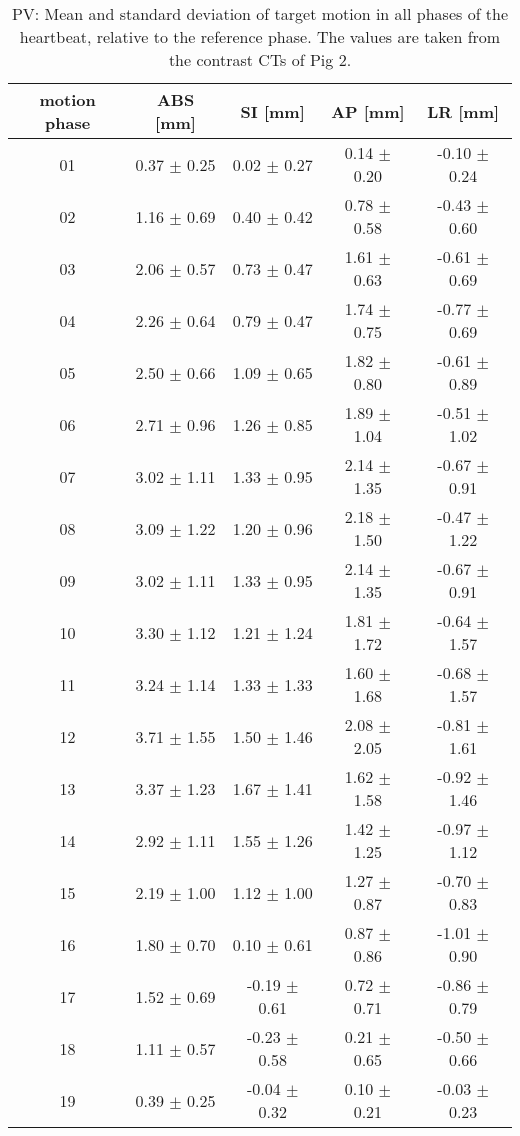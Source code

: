 

\begin{table}[H]
  \centering
  \scriptsize
  \caption{PV: Mean and standard deviation of target motion in all phases of the heartbeat, relative to the reference phase. The values are 
  taken from the contrast CTs of Pig 2.}
  \begin{tabular}{|c|c|c|c|c|}
    \hline\hline
    motion phase\rule{0pt}{2.6ex}\rule[-1.2ex]{0pt}{0pt} & ABS [mm] & SI [mm] & AP [mm] & LR [mm]\\
    \hline
01 &0.37 $\pm$ 0.25 &0.02 $\pm$ 0.27 &0.14 $\pm$ 0.20 &-0.10 $\pm$ 0.24 \\
02 &1.16 $\pm$ 0.69 &0.40 $\pm$ 0.42 &0.78 $\pm$ 0.58 &-0.43 $\pm$ 0.60 \\
03 &2.06 $\pm$ 0.57 &0.73 $\pm$ 0.47 &1.61 $\pm$ 0.63 &-0.61 $\pm$ 0.69 \\
04 &2.26 $\pm$ 0.64 &0.79 $\pm$ 0.47 &1.74 $\pm$ 0.75 &-0.77 $\pm$ 0.69 \\
05 &2.50 $\pm$ 0.66 &1.09 $\pm$ 0.65 &1.82 $\pm$ 0.80 &-0.61 $\pm$ 0.89 \\
06 &2.71 $\pm$ 0.96 &1.26 $\pm$ 0.85 &1.89 $\pm$ 1.04 &-0.51 $\pm$ 1.02 \\
07 &3.02 $\pm$ 1.11 &1.33 $\pm$ 0.95 &2.14 $\pm$ 1.35 &-0.67 $\pm$ 0.91 \\
08 &3.09 $\pm$ 1.22 &1.20 $\pm$ 0.96 &2.18 $\pm$ 1.50 &-0.47 $\pm$ 1.22 \\
09 &3.02 $\pm$ 1.11 &1.33 $\pm$ 0.95 &2.14 $\pm$ 1.35 &-0.67 $\pm$ 0.91 \\
10 &3.30 $\pm$ 1.12 &1.21 $\pm$ 1.24 &1.81 $\pm$ 1.72 &-0.64 $\pm$ 1.57 \\
11 &3.24 $\pm$ 1.14 &1.33 $\pm$ 1.33 &1.60 $\pm$ 1.68 &-0.68 $\pm$ 1.57 \\
12 &3.71 $\pm$ 1.55 &1.50 $\pm$ 1.46 &2.08 $\pm$ 2.05 &-0.81 $\pm$ 1.61 \\
13 &3.37 $\pm$ 1.23 &1.67 $\pm$ 1.41 &1.62 $\pm$ 1.58 &-0.92 $\pm$ 1.46 \\
14 &2.92 $\pm$ 1.11 &1.55 $\pm$ 1.26 &1.42 $\pm$ 1.25 &-0.97 $\pm$ 1.12 \\
15 &2.19 $\pm$ 1.00 &1.12 $\pm$ 1.00 &1.27 $\pm$ 0.87 &-0.70 $\pm$ 0.83 \\
16 &1.80 $\pm$ 0.70 &0.10 $\pm$ 0.61 &0.87 $\pm$ 0.86 &-1.01 $\pm$ 0.90 \\
17 &1.52 $\pm$ 0.69 &-0.19 $\pm$ 0.61 &0.72 $\pm$ 0.71 &-0.86 $\pm$ 0.79 \\
18 &1.11 $\pm$ 0.57 &-0.23 $\pm$ 0.58 &0.21 $\pm$ 0.65 &-0.50 $\pm$ 0.66 \\
19 &0.39 $\pm$ 0.25 &-0.04 $\pm$ 0.32 &0.10 $\pm$ 0.21 &-0.03 $\pm$ 0.23 \\
    \hline\hline
  \end{tabular}
  \label{tab:motion:PV:Pig2}
\end{table}

